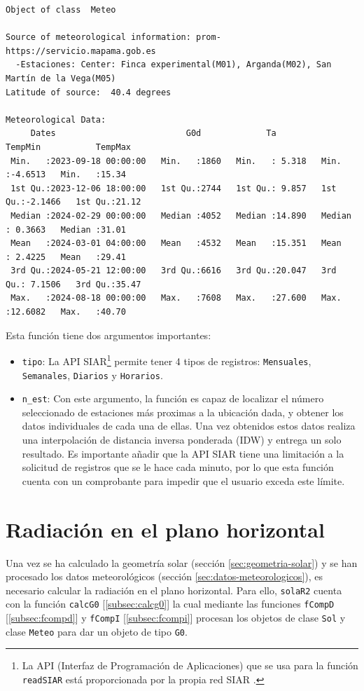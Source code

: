 \begin{verbatim}
Object of class  Meteo 

Source of meteorological information: prom-https://servicio.mapama.gob.es 
  -Estaciones: Center: Finca experimental(M01), Arganda(M02), San Martín de la Vega(M05) 
Latitude of source:  40.4 degrees

Meteorological Data:
     Dates                          G0d             Ta            TempMin           TempMax     
 Min.   :2023-09-18 00:00:00   Min.   :1860   Min.   : 5.318   Min.   :-4.6513   Min.   :15.34  
 1st Qu.:2023-12-06 18:00:00   1st Qu.:2744   1st Qu.: 9.857   1st Qu.:-2.1466   1st Qu.:21.12  
 Median :2024-02-29 00:00:00   Median :4052   Median :14.890   Median : 0.3663   Median :31.01  
 Mean   :2024-03-01 04:00:00   Mean   :4532   Mean   :15.351   Mean   : 2.4225   Mean   :29.41  
 3rd Qu.:2024-05-21 12:00:00   3rd Qu.:6616   3rd Qu.:20.047   3rd Qu.: 7.1506   3rd Qu.:35.47  
 Max.   :2024-08-18 00:00:00   Max.   :7608   Max.   :27.600   Max.   :12.6082   Max.   :40.70
\end{verbatim}

Esta función tiene dos argumentos importantes:
\begin{itemize}
\item \texttt{tipo}: La API SIAR\footnote{La API (Interfaz de Programación de Aplicaciones) que se usa para la función \texttt{readSIAR} está proporcionada por la propia red SIAR \cite{siar23}.} permite tener 4 tipos de registros: \texttt{Mensuales}, \texttt{Semanales}, \texttt{Diarios} y \texttt{Horarios}.
\item \texttt{n\_est}: Con este argumento, la función es capaz de localizar el número seleccionado de estaciones más proximas a la ubicación dada, y obtener los datos individuales de cada una de ellas. Una vez obtenidos estos datos realiza una interpolación de distancia inversa ponderada (IDW) y entrega un solo resultado. Es importante añadir que la API SIAR tiene una limitación a la solicitud de registros que se le hace cada minuto, por lo que esta función cuenta con un comprobante para impedir que el usuario exceda este límite.
\end{itemize}

\section{Radiación en el plano horizontal}
\label{sec:org5a0ed9f}
Una vez se ha calculado la geometría solar (sección \ref{sec:geometria-solar}) y se han procesado los datos meteorológicos (sección \ref{sec:datos-meteorologicos}), es necesario calcular la radiación en el plano horizontal. Para ello, \texttt{solaR2} cuenta con la función \texttt{calcG0} [\ref{subsec:calcg0}] la cual mediante las funciones \texttt{fCompD} [\ref{subsec:fcompd}] y \texttt{fCompI} [\ref{subsec:fcompi}] procesan los objetos de clase \texttt{Sol} y clase \texttt{Meteo} para dar un objeto de tipo \texttt{G0}.

